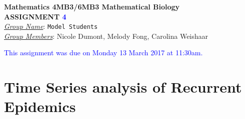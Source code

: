 \documentclass[12pt]{article}\usepackage[]{graphicx}\usepackage[]{color}
\begin{document}
\begin{center}
{\bf Mathematics 4MB3/6MB3 Mathematical Biology\\
 ASSIGNMENT \textcolor{blue}{4}}\\
\medskip
\underline{\emph{Group Name}}: \texttt{{\color{blue}Model Students}}\\
\medskip
\underline{\emph{Group Members}}: {\color{blue}Nicole Dumont, Melody Fong, Carolina Weishaar}
\end{center}

\bigskip
\noindent
\textcolor{blue}{This assignment was due on Monday 13 March 2017 at 11:30am.}

\bigskip

\section{Time Series analysis of Recurrent Epidemics}
\end{document}
